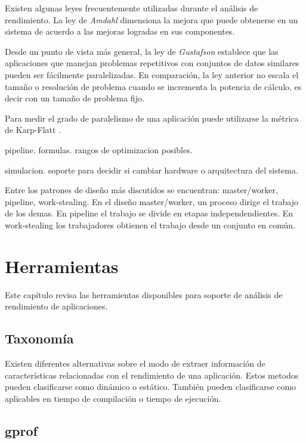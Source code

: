 \documentclass[a4paper]{report}
\begin{document}
\bigskip

Existen algunas leyes frecuentemente utilizadas durante el an\'alisis de
rendimiento. La ley de {\it Amdahl} \cite{amdahl} dimensiona la mejora que
puede obtenerse en un sistema de acuerdo a las mejoras logradas en sus
componentes.

\bigskip

Desde un punto de vista m\'as general, la ley de {\it Gustafson}
\cite{gustafson} establece que las aplicaciones que manejan problemas
repetitivos con conjuntos de datos similares pueden ser f\'acilmente
paralelizadas. En comparaci\'on, la ley anterior no escala el tama\~no o
resoluci\'on de problema cuando se incrementa la potencia de c\'alculo, es
decir con un tama\~no de problema fijo.

\bigskip

Para medir el grado de paralelismo de una aplicaci\'on puede utilizarse la
m\'etrica de Karp-Flatt \cite{karp-flatt}.

pipeline. formulas. rangos de optimizacion posibles.

simulacion. soporte para decidir si cambiar hardware o arquitectura del
sistema.

\bigskip

Entre los patrones de dise\~no m\'as discutidos se encuentran: master/worker,
pipeline, work-stealing. En el dise\~no master/worker, un proceso dirige el
trabajo de los demas. En pipeline el trabajo se divide en etapas
independendientes. En work-stealing los trabajadores obtienen el trabajo desde
un conjunto en com\'un.

\chapter{Herramientas}

Este cap\'itulo revisa las herramientas disponibles para soporte de an\'alisis
de rendimiento de aplicaciones.

\section{Taxonom\'ia}

Existen diferentes alternativas sobre el modo de extraer informaci\'on de
caracter\'isticas relacionadas con el rendimiento de una aplicaci\'on.
Estos metodos pueden clasificarse como din\'amico o est\'atico.
Tambi\'en pueden clasificarse como aplicables en tiempo de compilaci\'on o
tiempo de ejecuci\'on.

\section{gprof}
\end{document}
